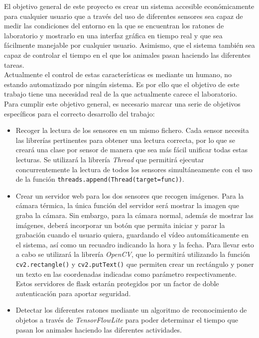 El objetivo general de este proyecto es crear un sistema accesible económicamente para cualquier usuario que a través del uso de diferentes sensores sea capaz de medir las condiciones del entorno en la que se encuentran los ratones de laboratorio y mostrarlo en una interfaz gráfica en tiempo real y que sea fácilmente manejable por cualquier usuario. Asimismo, que el sistema también sea capaz de controlar el tiempo en el que los animales pasan haciendo las diferentes tareas.\\
Actualmente el control de estas características es mediante un humano, no estando automatizado por ningún sistema. Es por ello que el objetivo de este trabajo tiene una necesidad real de la que actualmente carece el laboratorio.\\
Para cumplir este objetivo general, es necesario marcar una serie de objetivos específicos para el correcto desarrollo del trabajo:
\begin{itemize}
 \item Recoger la lectura de los sensores en un mismo fichero. Cada sensor necesita las librerías pertinentes para obtener una lectura correcta, por lo que se creará una clase por sensor de manera que sea más fácil unificar todas estas lecturas. Se utilizará la librería \textit{Thread} que permitirá ejecutar concurrentemente la lectura de todos los sensores simultáneamente con el uso de la función \verb|threads.append(Thread(target=func))|.
 \item Crear un servidor web para los dos sensores que recogen imágenes. Para la cámara térmica, la única función del servidor será mostrar la imagen que graba la cámara. Sin embargo, para la cámara normal, además de mostrar las imágenes, deberá incorporar un botón que permita iniciar y parar la grabación cuando el usuario quiera, guardando el vídeo automáticamente en el sistema, así como un recuadro indicando la hora y la fecha. Para llevar esto a cabo se utilizará la librería \textit{OpenCV}, que lo permitirá utilizando la función \verb|cv2.rectangle()| y \verb|cv2.putText()| que permiten crear un rectángulo y poner un texto en las coordenadas indicadas como parámetro respectivamente.\\
 Estos servidores de flask estarán protegidos por un factor de doble autenticación para aportar seguridad.
 \item Detectar los diferentes ratones mediante un algoritmo de reconocimiento de objetos a través de \textit{TensorFlowLite} para poder determinar el tiempo que pasan los animales haciendo las diferentes actividades.
\end{itemize}
